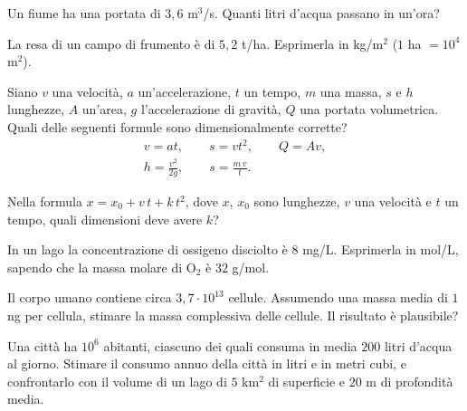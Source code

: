 \begin{esercizio}[\liv{2}]
Un fiume ha una portata di $3{,}6$ m$^{3}$/s. Quanti litri d'acqua passano in un'ora?
\end{esercizio}

\begin{esercizio}[\liv{2}]
La resa di un campo di frumento \`e di $5{,}2$ t/ha. Esprimerla in kg/m$^{2}$ ($1$ ha $=10^{4}$ m$^{2}$).
\end{esercizio}

\begin{esercizio}[\liv{2}]
Siano $v$ una velocit\`a, $a$ un'accelerazione, $t$ un tempo, $m$ una massa, $s$ e $h$ lunghezze, $A$ un'area, $g$ l'accelerazione di gravit\`a, $Q$ una portata volumetrica. Quali delle seguenti formule sono dimensionalmente corrette?
\begin{gather*}
v=at,\qquad s=vt^{2},\qquad Q=Av,\\
h=\frac{v^{2}}{2g},\qquad s=\frac{m\,v}{t}.
\end{gather*}
\end{esercizio}

\begin{esercizio}[\liv{2}]
Nella formula $x=x_{0}+v\,t+k\,t^{2}$, dove $x$, $x_{0}$ sono lunghezze, $v$ una velocit\`a e $t$ un tempo, quali dimensioni deve avere $k$?
\end{esercizio}

\begin{esercizio}[\liv{2}]
In un lago la concentrazione di ossigeno disciolto \`e $8$ mg/L. Esprimerla in mol/L, sapendo che la massa molare di O$_{2}$ \`e $32$ g/mol.
\end{esercizio}

\begin{esercizio}[\liv{2}]
Il corpo umano contiene circa $3{,}7\cdot10^{13}$ cellule. Assumendo una massa media di $1$ ng per cellula, stimare la massa complessiva delle cellule. Il risultato \`e plausibile?
\end{esercizio}

\begin{esercizio}[\liv{3}]
Una citt\`a ha $10^{6}$ abitanti, ciascuno dei quali consuma in media $200$ litri d'acqua al giorno. Stimare il consumo annuo della citt\`a in litri e in metri cubi, e confrontarlo con il volume di un lago di $5$ km$^{2}$ di superficie e $20$ m di profondit\`a media.
\end{esercizio}

